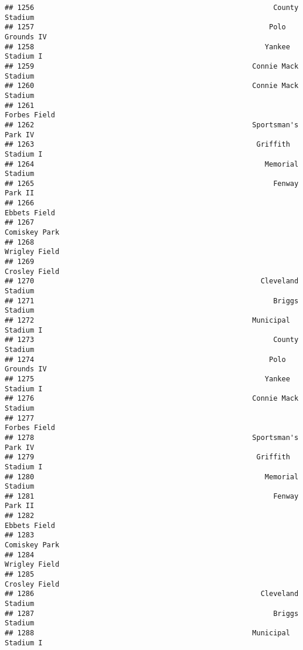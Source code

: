 \documentclass[]{article}
\begin{document}
\begin{verbatim}
## 1256                                                         County Stadium
## 1257                                                        Polo Grounds IV
## 1258                                                       Yankee Stadium I
## 1259                                                    Connie Mack Stadium
## 1260                                                    Connie Mack Stadium
## 1261                                                           Forbes Field
## 1262                                                    Sportsman's Park IV
## 1263                                                     Griffith Stadium I
## 1264                                                       Memorial Stadium
## 1265                                                         Fenway Park II
## 1266                                                           Ebbets Field
## 1267                                                          Comiskey Park
## 1268                                                          Wrigley Field
## 1269                                                          Crosley Field
## 1270                                                      Cleveland Stadium
## 1271                                                         Briggs Stadium
## 1272                                                    Municipal Stadium I
## 1273                                                         County Stadium
## 1274                                                        Polo Grounds IV
## 1275                                                       Yankee Stadium I
## 1276                                                    Connie Mack Stadium
## 1277                                                           Forbes Field
## 1278                                                    Sportsman's Park IV
## 1279                                                     Griffith Stadium I
## 1280                                                       Memorial Stadium
## 1281                                                         Fenway Park II
## 1282                                                           Ebbets Field
## 1283                                                          Comiskey Park
## 1284                                                          Wrigley Field
## 1285                                                          Crosley Field
## 1286                                                      Cleveland Stadium
## 1287                                                         Briggs Stadium
## 1288                                                    Municipal Stadium I

\end{verbatim}
\end{document}
